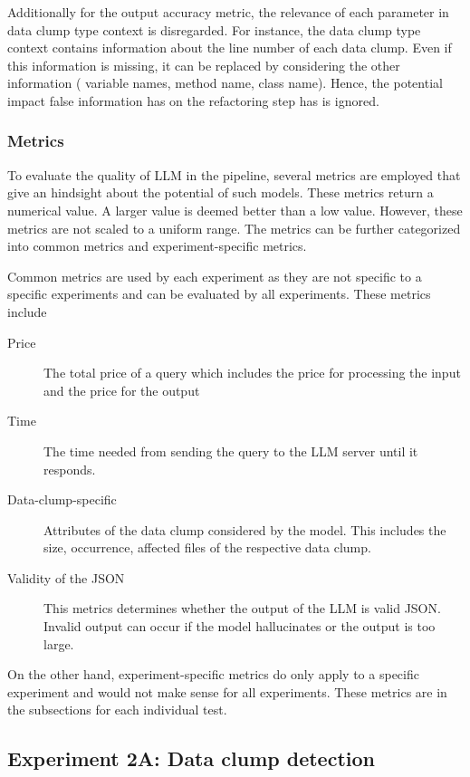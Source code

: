Additionally for the output accuracy metric, the relevance of each parameter in data clump type context is disregarded. For instance, the data clump type context contains information about the line number of each data clump. Even if this information is missing, it can be replaced by considering the other information ( variable names, method name, class name). Hence, the potential impact false information has on the refactoring step has is ignored. 





\subsubsection{Metrics}

To evaluate the quality of \ac{LLM} in the pipeline, several metrics are employed that give an hindsight about the potential of such models. These metrics return a numerical value.  A larger value is deemed better than a low value. However, these metrics are not scaled to a uniform range. The metrics can be further categorized into common metrics and experiment-specific metrics. 

Common metrics are used by each experiment as they are not specific to a specific experiments and can be evaluated by all experiments. These metrics include
\begin{description}
    \item [Price] The total price of a query which includes the price for processing the input and the price for the output
    \item [Time] The time needed from sending the query to the \ac{LLM} server until it responds. 
    \item[ Data-clump-specific] Attributes of the data clump considered by the model. This includes the size, occurrence, affected files of the respective data clump. 
    \item[Validity of the JSON] This metrics determines whether the output of the \ac{LLM} is valid \ac{JSON}. Invalid output can occur if the model hallucinates or the output is too large.
\end{description}


On the other hand, experiment-specific metrics do only apply to a specific experiment and would not make sense for all experiments. These metrics are in the subsections for each individual test. 


\subsection{Experiment 2A: Data clump detection}

